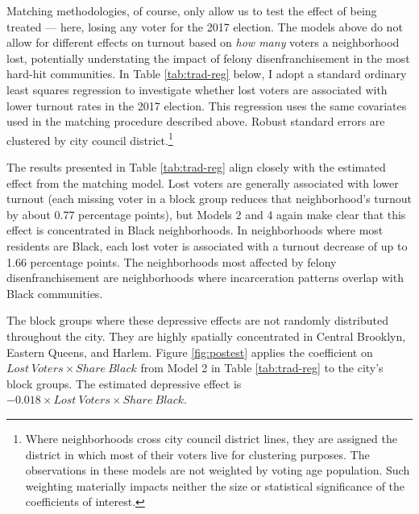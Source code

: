 \documentclass[]{article}
\let\rmarkdownfootnote\footnote%
\def\footnote{\protect\rmarkdownfootnote}
\begin{document}
Matching methodologies, of course, only allow us to test the effect of being treated --- here, losing any voter for the 2017 election. The models above do not allow for different effects on turnout based on \emph{how many} voters a neighborhood lost, potentially understating the impact of felony disenfranchisement in the most hard-hit communities. In Table \ref{tab:trad-reg} below, I adopt a standard ordinary least squares regression to investigate whether lost voters are associated with lower turnout rates in the 2017 election. This regression uses the same covariates used in the matching procedure described above. Robust standard errors are clustered by city council district.\footnote{Where neighborhoods cross city council district lines, they are assigned the district in which most of their voters live for clustering purposes. The observations in these models are not weighted by voting age population. Such weighting materially impacts neither the size or statistical significance of the coefficients of interest.}



The results presented in Table \ref{tab:trad-reg} align closely with the estimated effect from the matching model. Lost voters are generally associated with lower turnout (each missing voter in a block group reduces that neighborhood's turnout by about 0.77 percentage points), but Models 2 and 4 again make clear that this effect is concentrated in Black neighborhoods. In neighborhoods where most residents are Black, each lost voter is associated with a turnout decrease of up to 1.66 percentage points. The neighborhoods most affected by felony disenfranchisement are neighborhoods where incarceration patterns overlap with Black communities.

The block groups where these depressive effects are not randomly distributed throughout the city. They are highly spatially concentrated in Central Brooklyn, Eastern Queens, and Harlem. Figure \ref{fig:postest} applies the coefficient on \(Lost\ Voters \times Share\ Black\) from Model 2 in Table \ref{tab:trad-reg} to the city's block groups. The estimated depressive effect is \(-0.018\times Lost\ Voters \times Share\ Black\).
\end{document}
